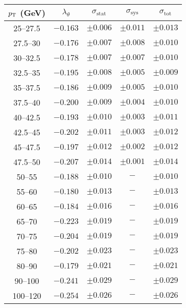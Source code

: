 \begin{tabular}{c|cccc}
$p_\text{T}$ (GeV) & $\lambda_\theta$ & $\sigma_{\text{stat}}$ & $\sigma_{\text{sys}}$ & $\sigma_{\text{tot}}$  \\
\hline
25--27.5& $-0.163$ & $\pm0.006$ & $\pm0.011$ & $\pm0.013$\\
27.5--30& $-0.176$ & $\pm0.007$ & $\pm0.008$ & $\pm0.010$\\
30--32.5& $-0.178$ & $\pm0.007$ & $\pm0.007$ & $\pm0.010$\\
32.5--35& $-0.195$ & $\pm0.008$ & $\pm0.005$ & $\pm0.009$\\
35--37.5& $-0.186$ & $\pm0.009$ & $\pm0.005$ & $\pm0.010$\\
37.5--40& $-0.200$ & $\pm0.009$ & $\pm0.004$ & $\pm0.010$\\
40--42.5& $-0.193$ & $\pm0.010$ & $\pm0.003$ & $\pm0.011$\\
42.5--45& $-0.202$ & $\pm0.011$ & $\pm0.003$ & $\pm0.012$\\
45--47.5& $-0.197$ & $\pm0.012$ & $\pm0.002$ & $\pm0.012$\\
47.5--50& $-0.207$ & $\pm0.014$ & $\pm0.001$ & $\pm0.014$\\
50--55& $-0.188$ & $\pm0.010$ & $-$ & $\pm0.010$\\
55--60& $-0.180$ & $\pm0.013$ & $-$ & $\pm0.013$\\
60--65& $-0.184$ & $\pm0.016$ & $-$ & $\pm0.016$\\
65--70& $-0.223$ & $\pm0.019$ & $-$ & $\pm0.019$\\
70--75& $-0.204$ & $\pm0.019$ & $-$ & $\pm0.019$\\
75--80& $-0.202$ & $\pm0.023$ & $-$ & $\pm0.023$\\
80--90& $-0.179$ & $\pm0.021$ & $-$ & $\pm0.021$\\
90--100& $-0.241$ & $\pm0.029$ & $-$ & $\pm0.029$\\
100--120& $-0.254$ & $\pm0.026$ & $-$ & $\pm0.026$\\
\end{tabular}
